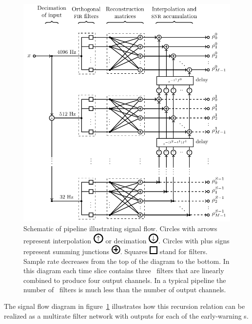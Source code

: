 \begin{figure}[htbp]
	\includegraphics{figures/lloid-diagram.pdf}
	\caption{\label{fig:pipeline} Schematic of \lloid{} pipeline illustrating
signal flow.  Circles with arrows represent interpolation
\protect\includegraphics{figures/upsample-symbol.pdf} or decimation
\protect\includegraphics{figures/downsample-symbol.pdf}.  Circles with plus
signs represent summing junctions
\protect\includegraphics{figures/adder-symbol.pdf}.  Squares
\protect\includegraphics{figures/fir-symbol.pdf} stand for \fir{} filters.  Sample
rate decreases from the top of the diagram to the bottom.  In this diagram each
time slice contains three \fir\ filters that are linearly combined to produce
four output channels.  In a typical pipeline the number of \fir\ filters is
much less than the number of output channels.}
\end{figure}
%
%
The signal flow diagram in figure~\ref{fig:pipeline} illustrates how this
recursion relation can be realized as a multirate filter network with outputs for
each of the early-warning \SNR{}s.

